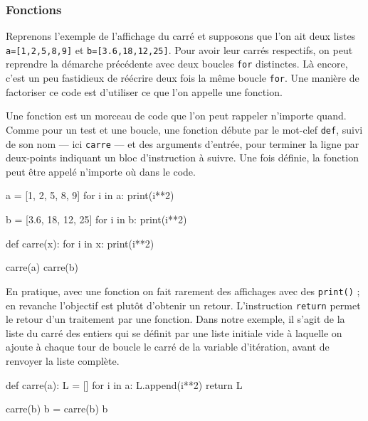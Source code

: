 \subsubsection[Fonctions]{Fonctions}
\label{subsub:XI.3.2.2}

Reprenons l'exemple de l'affichage du carré et supposons que l'on ait deux listes \texttt{a=[1,2,5,8,9]} et \texttt{b=[3.6,18,12,25]}. Pour avoir leur carrés respectifs, on peut reprendre la démarche précédente avec deux boucles \texttt{for} distinctes. Là encore, c'est un peu fastidieux de réécrire deux fois la même boucle \texttt{for}. Une manière de factoriser ce code est d'utiliser ce que l'on appelle une fonction.


Une fonction est un morceau de code que l'on peut rappeler n'importe quand. Comme pour un test et une boucle, une fonction débute par le mot-clef \texttt{def}, suivi de son nom --- ici \texttt{carre} --- et des arguments d'entrée, pour terminer la ligne par deux-points indiquant un bloc d'instruction à suivre. Une fois définie, la fonction peut être appelé n'importe où dans le code.

\begin{idleconsole}
\begin{pyconsole}
a = [1, 2, 5, 8, 9]
for i in a:
    print(i**2)

b = [3.6, 18, 12, 25]
for i in b:
    print(i**2)

def carre(x):
    for i in x:
        print(i**2)

carre(a)
carre(b)

\end{pyconsole}
\end{idleconsole}

\vspace{1pt}


En pratique, avec une fonction on fait rarement des affichages avec des \texttt{print()} ; en revanche l'objectif est plutôt d'obtenir un retour. L'instruction \texttt{return} permet le retour d'un traitement par une fonction. Dans notre exemple, il s'agit de la liste du carré des entiers qui se définit par une liste initiale vide à laquelle on ajoute à chaque tour de boucle le carré de la variable d'itération, avant de renvoyer la liste complète.

\begin{idleconsole}
\begin{pyconsole}
def carre(a):
    L = []
    for i in a:
        L.append(i**2)
    return L

carre(b)
b = carre(b)
b
\end{pyconsole}
\end{idleconsole}


